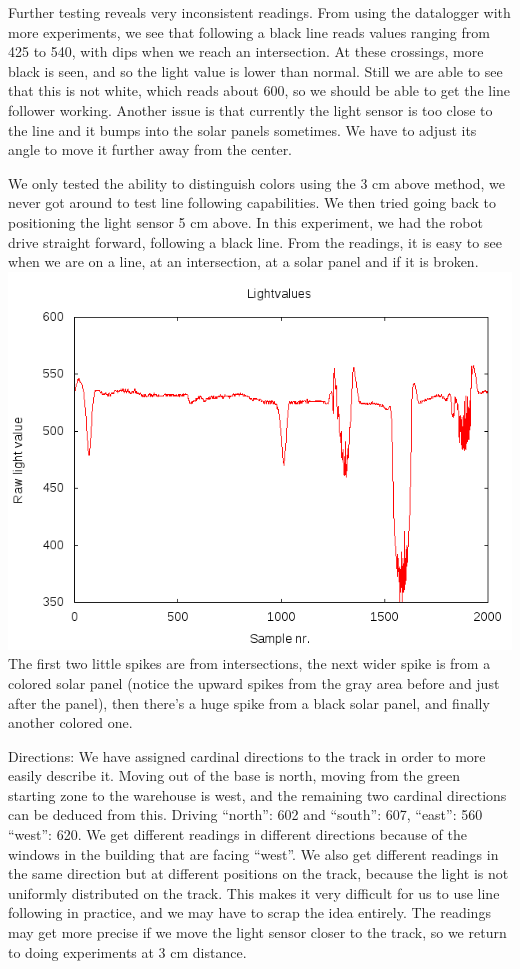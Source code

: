 Further testing reveals very inconsistent readings. From using the
datalogger with more experiments, we see that following a black line
reads values ranging from 425 to 540, with dips when we reach an
intersection. At these crossings, more black is seen, and so the light
value is lower than normal. Still we are able to see that this is not
white, which reads about 600, so we should be able to get the line
follower working. Another issue is that currently the light sensor is
too close to the line and it bumps into the solar panels sometimes. We
have to adjust its angle to move it further away from the center.

We only tested the ability to distinguish colors using the 3 cm above
method, we never got around to test line following capabilities. We then
tried going back to positioning the light sensor 5 cm above. In this
experiment, we had the robot drive straight forward, following a black
line. From the readings, it is easy to see when we are on a line, at an
intersection, at a solar panel and if it is
broken.
\includegraphics[scale=0.5]{../experiments/1prototype/results/gnuplot/GridAccuracyFollowBlack3cm.png}
The first two little spikes are from intersections, the next wider spike is
from a colored solar panel (notice the upward spikes from the gray area
before and just after the panel), then there's a huge spike from a black
solar panel, and finally another colored one.

Directions: We have assigned cardinal directions to the track in order
to more easily describe it. Moving out of the base is north, moving from
the green starting zone to the warehouse is west, and the remaining two
cardinal directions can be deduced from this. Driving ``north'': 602 and
``south'': 607, ``east'': 560 ``west'': 620. We get different readings
in different directions because of the windows in the building that are
facing ``west''. We also get different readings in the same direction
but at different positions on the track, because the light is not
uniformly distributed on the track. This makes it very difficult for us
to use line following in practice, and we may have to scrap the idea
entirely. The readings may get more precise if we move the light sensor
closer to the track, so we return to doing experiments at 3 cm distance.

